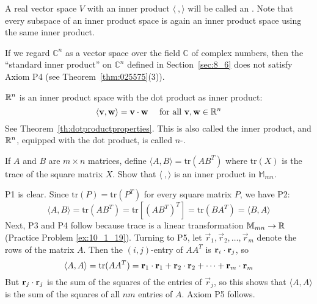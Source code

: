\documentclass{ximera}
\begin{document}
A real vector space $V$ with an inner product $\langle\ , \rangle$ will be called an .  Note that every subspace of an inner product space is again an inner product space using the same inner product.
\begin{remark}
    If we regard $\mathbb{C}^n$ as a vector space over the field $\mathbb{C}$  of complex numbers, then the ``standard inner product'' on $\mathbb{C}^n$ defined in Section~\ref{sec:8_6} does not satisfy Axiom P4 (see Theorem~\ref{thm:025575}(3)).
\end{remark}

\begin{example}\label{exa:030303}
$\mathbb{R}^n$ is an inner product space with the dot product as inner product:
\begin{equation*}
\langle \mathbf{v}, \mathbf{w} \rangle = \mathbf{v} \cdot \mathbf{w} \quad \mbox{ for all } \mathbf{v},  \mathbf{w} \in \mathbb{R}^n
\end{equation*}
See Theorem~\ref{th:dotproductproperties}. This is also called the
 inner product, and
$\mathbb{R}^n$, equipped with the dot product, is called 
$n$-.
\end{example}

\begin{example}\label{exa:030310}
If $A$ and $B$ are $m \times n$ matrices, define $\langle A, B\rangle = \mbox{tr}(AB^{T})$ where $\mbox{tr}(X)$ is the trace of the square matrix $X$. Show that $\langle\ , \rangle$ is an inner product in $\mathbb{M}_{mn}$.

\begin{explanation}
P1 is clear. Since $\mbox{tr}(P) = \mbox{tr}(P^{T})$ for every square matrix $P$, we have P2:
\begin{equation*}
\langle A, B \rangle = \mbox{tr}(AB^T) = \mbox{tr}[(AB^T)^T] = \mbox{tr}(BA^T) = \langle B, A \rangle
\end{equation*}
Next, P3 and P4 follow because trace is a linear transformation $\mathbb{M}_{mn} \to \mathbb{R}$ (Practice Problem \ref{ex:10_1_19}). Turning to P5, let $\vec{r}_{1}, \vec{r}_{2}, \dots, \vec{r}_{m}$ denote the rows of the matrix $A$. Then the $(i, j)$-entry of $AA^{T}$ is $\mathbf{r}_{i} \cdot \mathbf{r}_{j}$, so
\begin{equation*}
\langle A, A \rangle = \mbox{tr}(AA^T) =
\mathbf{r}_1 \cdot \mathbf{r}_1 +
\mathbf{r}_2 \cdot \mathbf{r}_2 + \dots +
\mathbf{r}_m \cdot \mathbf{r}_m
\end{equation*}
But $\mathbf{r}_{j} \cdot \mathbf{r}_{j}$ is the sum of the squares of
the entries of $\vec{r}_{j}$, so this shows that $\langle A, A\rangle$ is the sum of the squares of all $nm$ entries of $A$. Axiom P5 follows.
\end{explanation}
\end{example}
\end{document}
